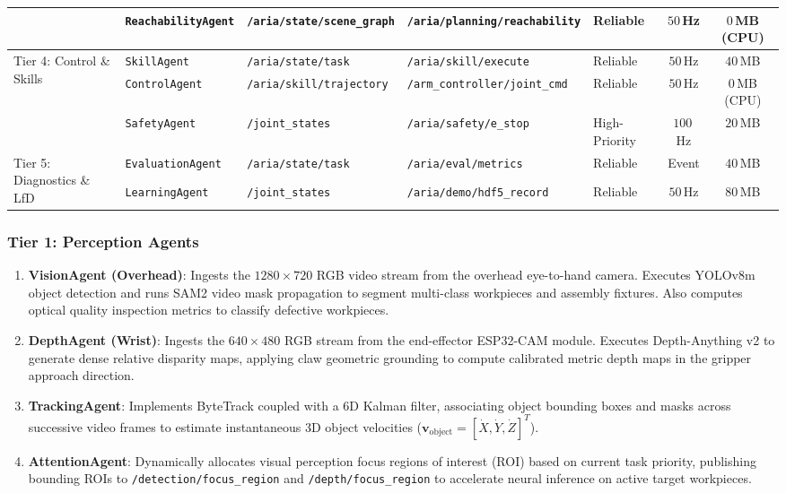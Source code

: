 \documentclass[journal]{IEEEtran}
\begin{document}
\begin{table}[!t]
{\begin{tabular}{lllllcc}
 & \texttt{ReachabilityAgent} & \texttt{/aria/state/scene\_graph} & \texttt{/aria/planning/reachability} & Reliable & $50$\,Hz & $0$\,MB (CPU) \\
\midrule
\multirow{3}{*}{Tier 4: Control \& Skills} & \texttt{SkillAgent} & \texttt{/aria/state/task} & \texttt{/aria/skill/execute} & Reliable & $50$\,Hz & $40$\,MB \\
 & \texttt{ControlAgent} & \texttt{/aria/skill/trajectory} & \texttt{/arm\_controller/joint\_cmd} & Reliable & $50$\,Hz & $0$\,MB (CPU) \\
 & \texttt{SafetyAgent} & \texttt{/joint\_states} & \texttt{/aria/safety/e\_stop} & High-Priority & $100$\,Hz & $20$\,MB \\
\midrule
\multirow{2}{*}{Tier 5: Diagnostics \& LfD} & \texttt{EvaluationAgent} & \texttt{/aria/state/task} & \texttt{/aria/eval/metrics} & Reliable & Event & $40$\,MB \\
 & \texttt{LearningAgent} & \texttt{/joint\_states} & \texttt{/aria/demo/hdf5\_record} & Reliable & $50$\,Hz & $80$\,MB \\
\bottomrule
\end{tabular}%
}
\end{table}

\subsubsection{Tier 1: Perception Agents}
\begin{enumerate}
    \item \textbf{VisionAgent (Overhead)}: Ingests the $1280\times720$ RGB video stream from the overhead eye-to-hand camera. Executes YOLOv8m object detection and runs SAM2 video mask propagation to segment multi-class workpieces and assembly fixtures. Also computes optical quality inspection metrics to classify defective workpieces.
    \item \textbf{DepthAgent (Wrist)}: Ingests the $640\times480$ RGB stream from the end-effector ESP32-CAM module. Executes Depth-Anything v2 to generate dense relative disparity maps, applying claw geometric grounding to compute calibrated metric depth maps in the gripper approach direction.
    \item \textbf{TrackingAgent}: Implements ByteTrack coupled with a 6D Kalman filter, associating object bounding boxes and masks across successive video frames to estimate instantaneous 3D object velocities ($\mathbf{v}_{\text{object}} = [\dot{X}, \dot{Y}, \dot{Z}]^T$).
    \item \textbf{AttentionAgent}: Dynamically allocates visual perception focus regions of interest (ROI) based on current task priority, publishing bounding ROIs to \texttt{/detection/focus\_region} and \texttt{/depth/focus\_region} to accelerate neural inference on active target workpieces.
\end{enumerate}
\end{document}
